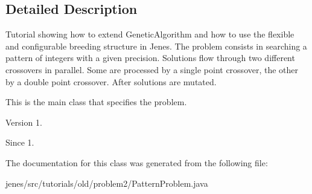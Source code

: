 \subsection{Detailed Description}
Tutorial showing how to extend {\ttfamily Genetic\-Algorithm} and how to use the flexible and configurable breeding structure in Jenes. The problem consists in searching a pattern of integers with a given precision. Solutions flow through two different crossovers in parallel. Some are processed by a single point crossover, the other by a double point crossover. After solutions are mutated.

This is the main class that specifies the problem.

\begin{DoxyVersion}{Version}
1.
\end{DoxyVersion}
\begin{DoxySince}{Since}
1. 
\end{DoxySince}


The documentation for this class was generated from the following file\-:\begin{DoxyCompactItemize}
\item 
jenes/src/tutorials/old/problem2/Pattern\-Problem.\-java\end{DoxyCompactItemize}
